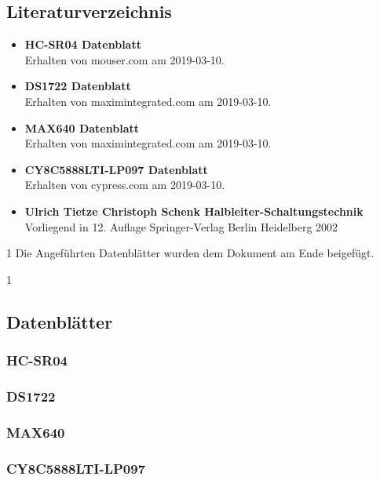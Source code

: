 \documentclass[12pt,a4paper]{article}
\def\datasheets{0}
\begin{document}
\subsection{Literaturverzeichnis}

\begin{itemize}
	
	\item{\textbf{HC-SR04 Datenblatt}}\\
		Erhalten von mouser.com am 2019-03-10.
	\item{\textbf{DS1722 Datenblatt}}\\
		Erhalten von maximintegrated.com am 2019-03-10.
	\item{\textbf{MAX640 Datenblatt}}\\
		Erhalten von maximintegrated.com am 2019-03-10.
	\item{\textbf{CY8C5888LTI-LP097 Datenblatt}}\\
		Erhalten von cypress.com am 2019-03-10.
	\item{\textbf{Ulrich Tietze Christoph Schenk 
		Halbleiter-Schaltungstechnik}}\\
		Vorliegend in 12. Auflage Springer-Verlag Berlin Heidelberg 2002

\end{itemize}

\if\datasheets1
	Die Angeführten Datenblätter wurden dem Dokument am Ende beigefügt.
\fi

\if\datasheets1
\subsection{Datenblätter}

	\subsubsection{HC-SR04}
	

	\subsubsection{DS1722}
	

	\subsubsection{MAX640}
	

	\subsubsection{CY8C5888LTI-LP097}
	

\fi %
\end{document}
